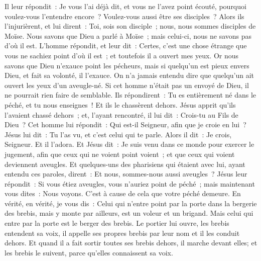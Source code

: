 \begin{multicols}{2}
Il leur répondit~: Je vous l'ai déjà dit, et vous ne l'avez point écouté, pourquoi voulez-vous l'entendre encore~? Voulez-vous aussi être ses disciples~?
Alors ils l'injurièrent, et lui dirent~: Toi, sois son disciple~; nous, nous sommes disciples de Moïse.
Nous savons que Dieu a parlé à Moïse~; mais celui-ci, nous ne savons pas d'où il est.
L'homme répondit, et leur dit~: Certes, c'est une chose étrange que vous ne sachiez point d'où il est~; et toutefois il a ouvert mes yeux.
Or nous savons que Dieu n'exauce point les pécheurs, mais si quelqu'un est pieux envers Dieu, et fait sa volonté, il l'exauce.
On n'a jamais entendu dire que quelqu'un ait ouvert les yeux d'un aveugle-né.
Si cet homme n'était pas un envoyé de Dieu, il ne pourrait rien faire de semblable.
Ils répondirent~: Tu es entièrement né dans le péché, et tu nous enseignes~! Et ils le chassèrent dehors.
Jésus apprit qu'ils l'avaient chassé dehors~; et, l'ayant rencontré, il lui dit~: Crois-tu au Fils de Dieu~?
Cet homme lui répondit~: Qui est-il Seigneur, afin que je croie en lui~?
Jésus lui dit~: Tu l'as vu, et c'est celui qui te parle.
Alors il dit~: Je crois, Seigneur. Et il l'adora.
Et Jésus dit~: Je suis venu dans ce monde pour exercer le jugement, afin que ceux qui ne voient point voient~; et que ceux qui voient deviennent aveugles.
Et quelques-uns des pharisiens qui étaient avec lui, ayant entendu ces paroles, dirent~: Et nous, sommes-nous aussi aveugles~?
Jésus leur répondit~: Si vous étiez aveugles, vous n'auriez point de péché~; mais maintenant vous dites~: Nous voyons. C'est à cause de cela que votre péché demeure.
\VerseOne{}En vérité, en vérité, je vous dis~: Celui qui n'entre point par la porte dans la bergerie des brebis, mais y monte par ailleurs, est un voleur et un brigand.
Mais celui qui entre par la porte est le berger des brebis.
Le portier lui ouvre, les brebis entendent sa voix, il appelle ses propres brebis par leur nom et il les conduit dehors.
Et quand il a fait sortir toutes ses brebis dehors, il marche devant elles; et les brebis le suivent, parce qu'elles connaissent sa voix.

\end{multicols}

